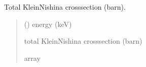 \documentclass[letterpaper,10pt,english,openany,oneside]{sphinxmanual}
\begin{document}
\begin{fulllineitems}
\label{\detokenize{api/cross_sections:dxraylib.CS_KN}}
\pysigstartsignatures
{}
\pysigstopsignatures
\sphinxAtStartPar
Total Klein\sphinxhyphen{}Nishina cross\sphinxhyphen{}section (barn).
\begin{quote}\begin{description}
\sphinxAtStartPar
{} () \textendash{} energy (keV)

\sphinxAtStartPar
total Klein\sphinxhyphen{}Nishina cross\sphinxhyphen{}section (barn)

\sphinxAtStartPar
array

\end{description}\end{quote}

\end{fulllineitems}


\begin{DUlineblock}{0em}
\item[] 
\end{DUlineblock}
\end{document}
